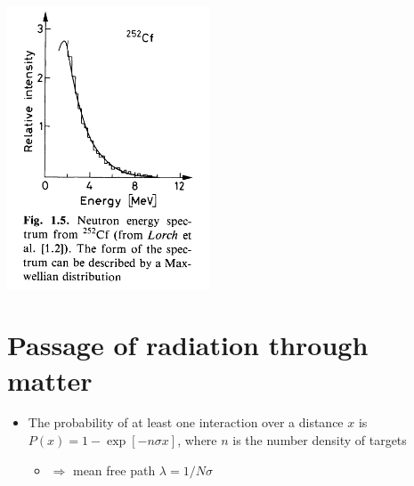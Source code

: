 \begin{itemize}
\begin{center}
  \includegraphics[width=0.45\textwidth,valign=t]{figs/q_neutron.png}
\end{center}
\end{itemize}

\section{Passage of radiation through matter}
\begin{itemize}
  \item The probability of at least one interaction over a distance $x$ is $P(x) = 1-\exp[-n\sigma x]$, where $n$ is the number density of targets
  \begin{itemize}
    \item $\Rightarrow$ mean free path $\lambda = 1/N\sigma$
  \end{itemize}
\end{itemize}
